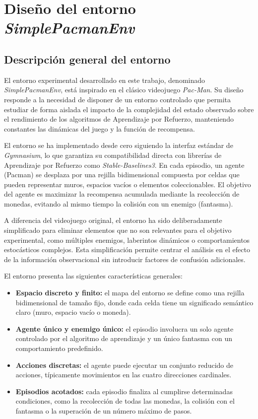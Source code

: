 \section{Diseño del entorno \textit{SimplePacmanEnv}}

\subsection{Descripción general del entorno}

El entorno experimental desarrollado en este trabajo, denominado \textit{SimplePacmanEnv}, está inspirado en el clásico videojuego \textit{Pac-Man}. Su diseño responde a la necesidad de disponer de un entorno controlado que permita estudiar de forma aislada el impacto de la complejidad del estado observado sobre el rendimiento de los algoritmos de Aprendizaje por Refuerzo, manteniendo constantes las dinámicas del juego y la función de recompensa.

El entorno se ha implementado desde cero siguiendo la interfaz estándar de \textit{Gymnasium}, lo que garantiza su compatibilidad directa con librerías de Aprendizaje por Refuerzo como \textit{Stable-Baselines3}. En cada episodio, un agente (Pacman) se desplaza por una rejilla bidimensional compuesta por celdas que pueden representar muros, espacios vacíos o elementos coleccionables. El objetivo del agente es maximizar la recompensa acumulada mediante la recolección de monedas, evitando al mismo tiempo la colisión con un enemigo (fantasma).

A diferencia del videojuego original, el entorno ha sido deliberadamente simplificado para eliminar elementos que no son relevantes para el objetivo experimental, como múltiples enemigos, laberintos dinámicos o comportamientos estocásticos complejos. Esta simplificación permite centrar el análisis en el efecto de la información observacional sin introducir factores de confusión adicionales.

El entorno presenta las siguientes características generales:
\begin{itemize}
    \item \textbf{Espacio discreto y finito:} el mapa del entorno se define como una rejilla bidimensional de tamaño fijo, donde cada celda tiene un significado semántico claro (muro, espacio vacío o moneda).
    \item \textbf{Agente único y enemigo único:} el episodio involucra un solo agente controlado por el algoritmo de aprendizaje y un único fantasma con un comportamiento predefinido.
    \item \textbf{Acciones discretas:} el agente puede ejecutar un conjunto reducido de acciones, típicamente movimientos en las cuatro direcciones cardinales.
    \item \textbf{Episodios acotados:} cada episodio finaliza al cumplirse determinadas condiciones, como la recolección de todas las monedas, la colisión con el fantasma o la superación de un número máximo de pasos.
\end{itemize}

